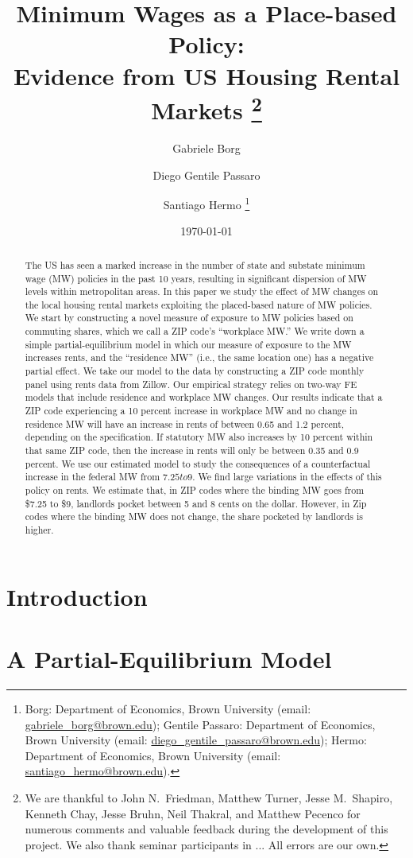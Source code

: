\documentclass{article}
\title{ Minimum Wages as a Place-based Policy: \\
        Evidence from US Housing Rental Markets
        \thanks{We are thankful to John N.\ Friedman, Matthew Turner, Jesse M.\ Shapiro, 
        Kenneth Chay, Jesse Bruhn, Neil Thakral, and Matthew Pecenco for numerous 
        comments and valuable feedback during the development of this project.
        We also thank seminar participants in ... %
        All errors are our own.}}
\author{Gabriele Borg \and Diego Gentile Passaro \and Santiago Hermo
        \footnote{
        Borg: Department of Economics, Brown University 
        (email: \url{gabriele_borg@brown.edu}); 
        Gentile Passaro: Department of Economics, Brown University 
        (email: \url{diego_gentile_passaro@brown.edu}); 
        Hermo: Department of Economics, Brown University 
        (email: \url{santiago_hermo@brown.edu}).}}
\date{\today}
\begin{document}
\maketitle

\begin{abstract}
    \noindent
    The US has seen a marked increase in the number of state and substate minimum 
    wage (MW) policies in the past 10 years, resulting in significant dispersion 
    of MW levels within metropolitan areas.
    In this paper we study the effect of MW changes on the local housing rental 
    markets exploiting the placed-based nature of MW policies.
    We start by constructing a novel measure of exposure to MW policies based on 
    commuting shares, which we call a ZIP code's ``workplace MW.''
    We write down a simple partial-equilibrium model in which our measure of 
    exposure to the MW increases rents, and the ``residence MW'' (i.e., the same 
    location one) has a negative partial effect.
    We take our model to the data by constructing a ZIP code monthly panel using 
    rents data from Zillow.
    Our empirical strategy relies on two-way FE models that include residence and 
    workplace MW changes.
    Our results indicate that a ZIP code experiencing a 10 percent increase in 
    workplace MW and no change in residence MW will have an increase in rents of 
    between 0.65 and 1.2 percent, depending on the specification.
    If statutory MW also increases by 10 percent within that same ZIP code, then
    the increase in rents will only be between 0.35 and 0.9 percent.
    We use our estimated model to study the consequences of a counterfactual
    increase in the federal MW from $7.25 to $9.
    We find large variations in the effects of this policy on rents. 
    We estimate that, in ZIP codes where the binding MW goes from \$7.25 to \$9,
    landlords pocket between 5 and 8 cents on the dollar.
    However, in Zip codes where the binding MW does not change, the share pocketed
    by landlords is higher. 
\end{abstract}

\vspace{5mm}


\clearpage

\section{Introduction}\label{sec:intro}
    

\section{A Partial-Equilibrium Model}\label{sec:model}
    
\end{document}
